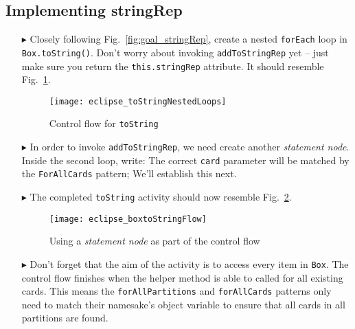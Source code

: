 \newpage
\hypertarget{stringRep tex}{}
\subsection{Implementing stringRep}
\texHeader

\vspace{0.5cm}

\begin{itemize}
  
\item[$\blacktriangleright$] Closely following Fig.~\ref{fig:goal_stringRep}, create a nested \texttt{forEach} loop in \texttt{Box.toString()}.
Don't worry about invoking \texttt{addToStringRep} yet -- just make sure you return the \texttt{this.stringRep} attribute. It should resemble
Fig.~\ref{fig:emptyLoops}.

\begin{figure}[htp]
\begin{center}
  \texttt{[image: eclipse\_toStringNestedLoops]}
  \caption{Control flow for \texttt{toString}}
  \label{fig:emptyLoops}
\end{center}
\end{figure}

\item[$\blacktriangleright$] In order to invoke \texttt{addToStringRep}, we need create another \emph{statement node}. Inside the second loop, write:
The correct \texttt{card} parameter will be matched by the \texttt{ForAllCards} pattern; We'll establish this next.

\vspace{0.5cm}

\item[$\blacktriangleright$] The completed \texttt{toString} activity should now resemble Fig.~\ref{fig:toStringFlow}.

\vspace{0.5cm}

\begin{figure}[htp]
\begin{center}
  \texttt{[image: eclipse\_boxtoStringFlow]}
  \caption{Using a \emph{statement node} as part of the control flow}
  \label{fig:toStringFlow}
\end{center}
\end{figure}

\item[$\blacktriangleright$] Don't forget that the aim of the activity is to access every item in \texttt{Box}. The control flow finishes when the helper
method is able to called for all existing cards. This means the \texttt{forAllPartitions} and \texttt{forAllCards} patterns only need to match their
namesake's object variable to ensure that all cards in all partitions are found.


\end{itemize}
